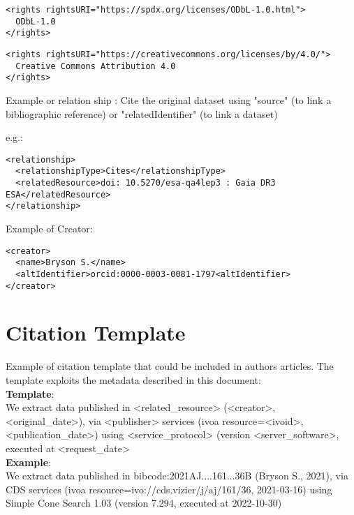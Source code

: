 \documentclass[11pt,a4paper]{ivoa}
\begin{document}
\begin{verbatim}
<rights rightsURI="https://spdx.org/licenses/ODbL-1.0.html">
  ODbL-1.0
</rights>
\end{verbatim}

\begin{verbatim}
<rights rightsURI="https://creativecommons.org/licenses/by/4.0/">
  Creative Commons Attribution 4.0
</rights>
\end{verbatim}


Example or relation ship :
Cite the original dataset using "source" (to link a bibliographic reference) or "relatedIdentifier" (to link a dataset)

e.g.:
\begin{verbatim}
<relationship>
  <relationshipType>Cites</relationshipType>
  <relatedResource>doi: 10.5270/esa-qa4lep3 : Gaia DR3 ESA</relatedResource>
</relationship>
\end{verbatim}

Example of Creator:
\begin{verbatim}
<creator>
  <name>Bryson S.</name>
  <altIdentifier>orcid:0000-0003-0081-1797<altIdentifier>
</creator>
\end{verbatim}

%

\section{Citation Template}

Example of citation template that could be included in authors articles. The template exploits the metadata described in this document:\\

\textbf{Template}:\\
We extract data published in <related\_resource> (<creator>, <original\_date>),
via <publisher> services (ivoa resource=<ivoid>, <publication\_date>)
using <service\_protocol> (version <server\_software>, executed at <request\_date>\\


\textbf{Example}:\\
We extract data published in bibcode:2021AJ....161...36B (Bryson S., 2021),
via CDS services (ivoa resource=ivo://cds.vizier/j/aj/161/36, 2021-03-16)
using Simple Cone Search 1.03 (version 7.294, executed at 2022-10-30)
\end{document}
